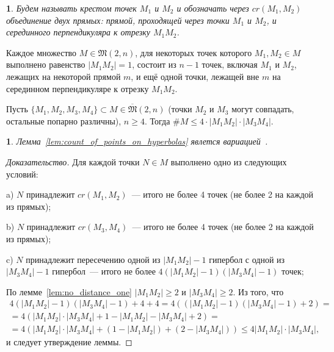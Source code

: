 \documentclass[11pt,twoside,draft
]{article}
\newtheorem{Definition}{\indent {\sc Definition}}
\newtheorem{Remark}{\indent {\sc Remark}}
\begin{document}
\begin{Definition}
	\cite[Definition 2.5]{my-pps-linear-bound-2019}
	Будем называть \textit{крестом} точек $M_1$ и $M_2$ и обозначать через $cr(M_1,M_2)$ объединение двух прямых:
	прямой, проходящей через точки $M_1$ и $M_2$,
	и серединного перпендикуляра к отрезку $M_1 M_2$.
\end{Definition}

\begin{lemma}
	\cite[Theorem 3.10]{my-pps-linear-bound-2019}
	\label{lem:no_distance_one}
	Каждое множество $M\in\mathfrak{M}(2,n)$,
	для некоторых точек которого $M_1,M_2 \in M$ выполнено равенство $|M_1 M_2|=1$,
	состоит из $n-1$ точек, включая $M_1$ и $M_2$, лежащих на некоторой прямой $m$,
	и ещё одной точки, лежащей вне $m$ на серединном перпендикуляре к отрезку $M_1 M_2$.
\end{lemma}


\begin{lemma}
	\label{lem:count_of_points_on_hyperbolas}
	Пусть $\{M_1, M_2, M_3, M_4\} \subset M\in\overline{\mathfrak{M}}(2,n)$
	(точки $M_2$ и $M_3$ могут совпадать, остальные попарно различны), $n\geq 4$.
	Тогда $\# M \leq 4 \cdot |M_1 M_2| \cdot |M_3 M_4|$.
\end{lemma}

\begin{Remark}
	Лемма~\ref{lem:count_of_points_on_hyperbolas} явлется вариацией~\cite{erdos1945integral}.
\end{Remark}

\begin{proof}[Доказательство]
	Для каждой точки $N\in M$ выполнено одно из следующих условий:

	a) $N$ принадлежит $cr(M_1,M_2)$~--- итого не более 4 точек (не более 2 на каждой из прямых);

	b) $N$ принадлежит $cr(M_3,M_4)$~--- итого не более 4 точек (не более 2 на каждой из прямых);

	c) $N$ принадлежит пересечению одной из $|M_1 M_2| - 1$ гипербол
	с одной из $|M_3 M_4| - 1$ гипербол~--- итого не более  $4 (|M_1 M_2| - 1)(|M_3 M_4| - 1)$ точек;

	По лемме~\ref{lem:no_distance_one} $|M_1 M_2| \geq 2$ и $|M_3 M_4| \geq 2$.
	Из того, что
	\begin{multline}
		4 (|M_1 M_2| - 1)(|M_3 M_4| - 1) + 4 + 4
		=
		4 ( (|M_1 M_2| - 1)(|M_3 M_4| - 1) + 2)
		=
		\\=
		4 ( |M_1 M_2| \cdot |M_3 M_4| + 1 - |M_1 M_2| - |M_3 M_4| + 2)
		=
		\\=
		4 ( |M_1 M_2| \cdot |M_3 M_4| + (1 - |M_1 M_2|) + (2 - |M_3 M_4|))
		\leq
		4 |M_1 M_2| \cdot |M_3 M_4|
		,
	\end{multline}
	и следует утверждение леммы.
\end{proof}
\end{document}
